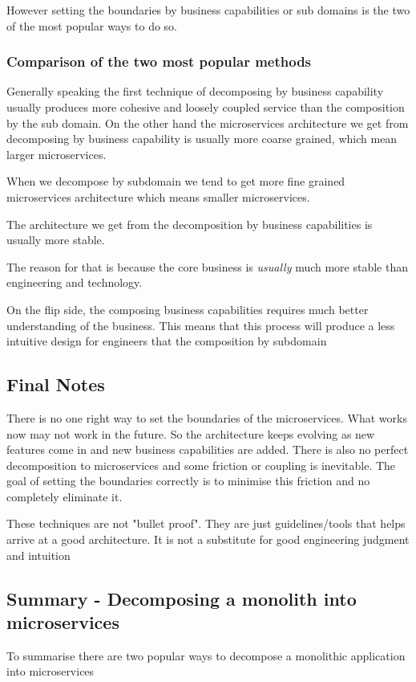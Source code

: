 However setting the boundaries by business capabilities or sub domains is the two of the most popular ways to do so.

\subsubsection{Comparison of the two most popular methods}
Generally speaking the first technique of decomposing by business capability usually produces more cohesive and loosely coupled service than the composition by the sub domain.
On the other hand the microservices architecture we get from decomposing by business capability is usually more coarse grained, which mean larger microservices.

When we decompose by subdomain we tend to get more fine grained microservices architecture which means smaller microservices.
\begin{note}
    The architecture we get from the decomposition by business capabilities is usually more stable.
\end{note}
The reason for that is because the core business is \textit{usually} much more stable than engineering and technology.

On the flip side, the composing business capabilities requires much better understanding of the business.
This means that this process will produce a less intuitive design for engineers that the composition by subdomain

\subsection{Final Notes}
There is no one right way to set the boundaries of the microservices.
What works now may not work in the future.
So the architecture keeps evolving as new features come in and new business capabilities are added.
There is also no perfect decomposition to microservices and some friction or coupling is inevitable.
The goal of setting the boundaries correctly is to minimise this friction and no completely eliminate it.

These techniques are not "bullet proof".
They are just guidelines/tools that helps arrive at a good architecture.
It is not a substitute for good engineering judgment and intuition

\subsection{Summary - Decomposing a monolith into microservices}
To summarise there are two popular ways to decompose a monolithic application into microservices


